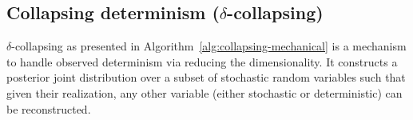 \documentclass[]{article}
\begin{document}
\subsection{Collapsing determinism ($\delta$-collapsing)}%
\label{sect:collapse}
$\delta$-collapsing as presented in Algorithm~\ref{alg:collapsing-mechanical}
is a mechanism to handle observed determinism via reducing the dimensionality. 
It constructs a posterior joint distribution over a subset of stochastic random variables such that given their realization, any other variable (either stochastic or deterministic)
can be reconstructed.%
\end{document}
